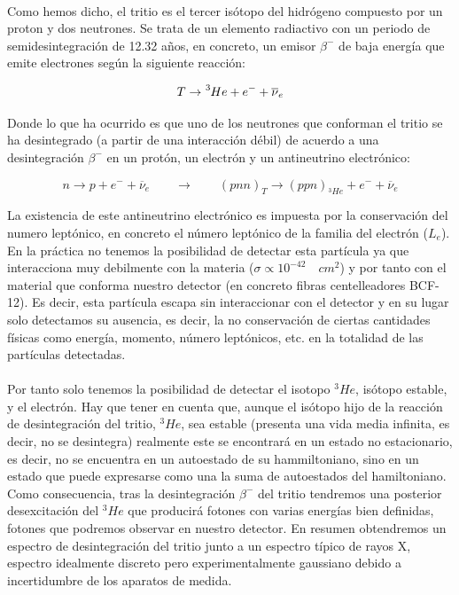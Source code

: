 \documentclass[11pt, a4paper]{article}
\begin{document}
\paragraph {}
Como hemos dicho, el tritio es el tercer isótopo del hidrógeno compuesto por un proton y dos neutrones. Se trata de un elemento radiactivo con un periodo de semidesintegración de 12.32 años, en concreto, un emisor $\beta^-$ de baja energía que emite electrones según la siguiente reacción:

$$T \rightarrow \ce{^{3}{He}} + e^- + \overline{\nu}_e$$

Donde lo que ha ocurrido es que uno de los neutrones que conforman el tritio se ha desintegrado (a partir de una interacción débil) de acuerdo a una desintegración $\beta^-$ en un protón, un electrón y un antineutrino electrónico:

$$n \rightarrow p + e^- + \overline{\nu}_e \qquad \rightarrow \qquad (pnn)_T\rightarrow (ppn)_{^3He} + e^- + \overline{\nu}_e $$

La existencia de este antineutrino electrónico es impuesta por la conservación del numero leptónico, en concreto el número leptónico de la familia del electrón ($L_e$). En la práctica no tenemos la posibilidad de detectar esta partícula ya que interacciona muy debilmente con la materia ($\sigma \propto 10^{-42} \quad cm^2$) y por tanto con el material que conforma nuestro detector (en concreto fibras centelleadores BCF-12). Es decir, esta partícula escapa sin interaccionar con el detector y en su lugar solo detectamos su ausencia, es decir, la no conservación de ciertas cantidades físicas como energía, momento, número leptónicos, etc. en la totalidad de las partículas detectadas.

\paragraph {}
Por tanto solo tenemos la posibilidad de detectar el isotopo $^3He$, isótopo estable, y el electrón. Hay que tener en cuenta que, aunque el isótopo hijo de la reacción de desintegración del tritio, $^3He$, sea estable (presenta una vida media infinita, es decir, no se desintegra) realmente este se encontrará en un estado no estacionario, es decir, no se encuentra en un autoestado de su hammiltoniano, sino en un estado que puede expresarse como una la suma de autoestados del hamiltoniano. Como consecuencia, tras la desintegración $\beta^-$ del tritio tendremos una posterior desexcitación del $^3He$ que producirá fotones con varias energías bien definidas, fotones que podremos observar en nuestro detector. En resumen obtendremos un espectro de desintegración del tritio junto a un espectro típico de rayos X, espectro idealmente discreto pero experimentalmente gaussiano debido a incertidumbre de los aparatos de medida.
\end{document}
